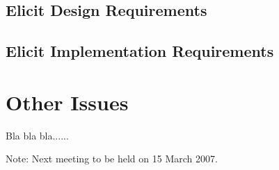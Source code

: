 \documentclass[11pt, a4paper]{article}
\begin{document}
\subsection{Elicit Design Requirements}


\subsection{Elicit Implementation Requirements}


\section{Other Issues}
Bla bla bla......

\vspace*{10pt}
\noindent Note: Next meeting to be held on 15 March 2007.
\end{document}
